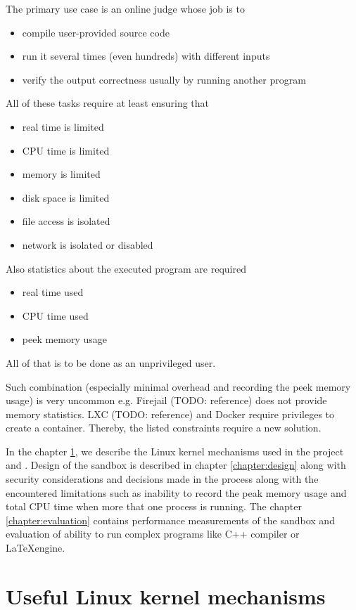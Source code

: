 \documentclass[licencjacka,en]{pracamgr}
\begin{document}
The primary use case is an online judge whose job is to
\begin{itemize}
    \item compile user-provided source code
    \item run it several times (even hundreds) with different inputs
    \item verify the output correctness usually by running another program
\end{itemize}
All of these tasks require at least ensuring that
\begin{itemize}
    \item real time is limited
    \item CPU time is limited
    \item memory is limited
    \item disk space is limited
    \item file access is isolated
    \item network is isolated or disabled
\end{itemize}
Also statistics about the executed program are required
\begin{itemize}
    \item real time used
    \item CPU time used
    \item peek memory usage
\end{itemize}
All of that is to be done as an unprivileged user.

Such combination (especially minimal overhead and recording the peek memory usage) is very uncommon e.g. Firejail (TODO: reference) does not provide memory statistics. LXC (TODO: reference) and Docker require privileges to create a container. Thereby, the listed constraints require a new solution.

In the chapter \ref{chapter:linux_mechanism}, we describe the Linux kernel mechanisms used in the project and . Design of the sandbox is described in chapter \ref{chapter:design} along with security considerations and decisions made in the process along with the encountered limitations such as inability to record the peak memory usage and total CPU time when more that one process is running. The chapter \ref{chapter:evaluation} contains performance measurements of the sandbox and evaluation of ability to run complex programs like C++ compiler or \LaTeX engine.

\chapter{Useful Linux kernel mechanisms} \label{chapter:linux_mechanism}
\end{document}
